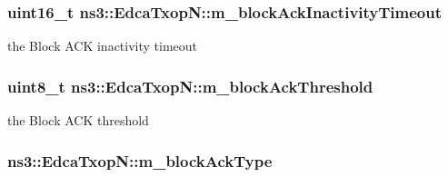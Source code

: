 \subsubsection[{\texorpdfstring{m\+\_\+block\+Ack\+Inactivity\+Timeout}{m_blockAckInactivityTimeout}}]{\setlength{\rightskip}{0pt plus 5cm}uint16\+\_\+t ns3\+::\+Edca\+Txop\+N\+::m\+\_\+block\+Ack\+Inactivity\+Timeout\hspace{0.3cm}{\ttfamily [private]}}\hypertarget{classns3_1_1EdcaTxopN_a0f4087f940a73110911420a41ded5ce5}{}\label{classns3_1_1EdcaTxopN_a0f4087f940a73110911420a41ded5ce5}


the Block A\+CK inactivity timeout 

\subsubsection[{\texorpdfstring{m\+\_\+block\+Ack\+Threshold}{m_blockAckThreshold}}]{\setlength{\rightskip}{0pt plus 5cm}uint8\+\_\+t ns3\+::\+Edca\+Txop\+N\+::m\+\_\+block\+Ack\+Threshold\hspace{0.3cm}{\ttfamily [private]}}\hypertarget{classns3_1_1EdcaTxopN_a158bbee5ed109f1e17927188053ea05a}{}\label{classns3_1_1EdcaTxopN_a158bbee5ed109f1e17927188053ea05a}


the Block A\+CK threshold 

\subsubsection[{\texorpdfstring{m\+\_\+block\+Ack\+Type}{m_blockAckType}}]{ ns3\+::\+Edca\+Txop\+N\+::m\+\_\+block\+Ack\+Type\hspace{0.3cm}{\ttfamily [private]}}\hypertarget{classns3_1_1EdcaTxopN_a40f224c6cb6c7470553d28b2f04c429d}{}\label{classns3_1_1EdcaTxopN_a40f224c6cb6c7470553d28b2f04c429d}


